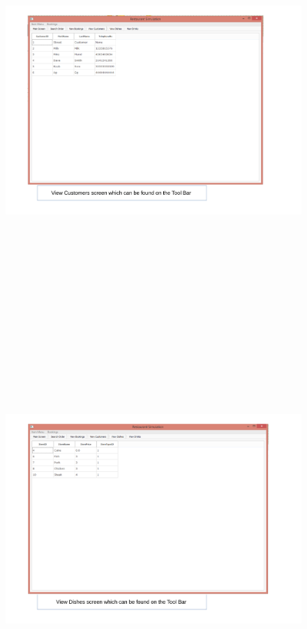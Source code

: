 \begin{landscape}
\begin{figure}[H]
    \includegraphics[height = 15cm]{./Maintenance/images/screen19}
    \caption{} \label{fig:screen19}
\end{figure}

\begin{figure}[H]
    \includegraphics[height = 15cm]{./Maintenance/images/screen20}
    \caption{} \label{fig:screen20}
\end{figure}


\end{landscape}
